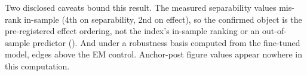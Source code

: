 Two disclosed caveats bound this result. The measured separability values
mis-rank  in-sample (4th on separability,
2nd on effect), so the confirmed object is the pre-registered effect
ordering, not the index's in-sample ranking or an out-of-sample predictor
(). And under a robustness basis computed from the
fine-tuned model,  edges above the EM control. Anchor-post
figure values appear nowhere in this computation.
